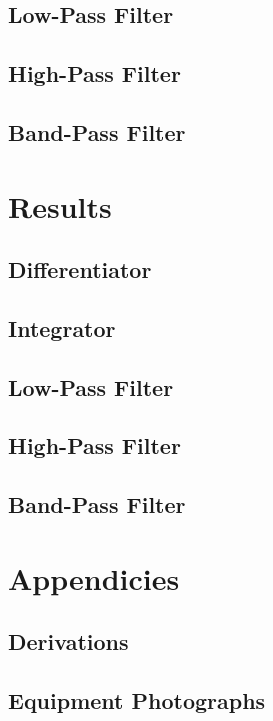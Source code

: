 \documentclass[a4paper,10pt]{report}
\begin{document}
	\section{Low-Pass Filter}
	\section{High-Pass Filter}
	\section{Band-Pass Filter}

\chapter{Results}
	\section{Differentiator}
	\section{Integrator}
	\section{Low-Pass Filter}
	\section{High-Pass Filter}
	\section{Band-Pass Filter}


\chapter{Appendicies}
	\section{Derivations}
	\section{Equipment Photographs}
\end{document}
